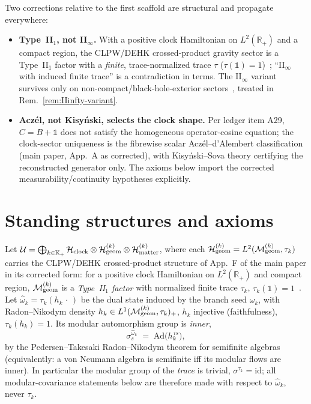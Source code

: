 \documentclass[11pt,a4paper]{article}
\theoremstyle{definition}
\theoremstyle{remark}
\newcommand{\HH}{\mathcal{H}}
\newcommand{\MM}{\mathcal{M}}
\newcommand{\RR}{\mathbb{R}}
\newcommand{\id}{\mathbb{1}}
\newcommand{\KK}{\mathbb{K}}
\newcommand{\tr}{\tau}
\begin{document}
Two corrections relative to the first scaffold are structural
and propagate everywhere:
\begin{itemize}[leftmargin=*,nosep]
  \item \textbf{Type~II$_1$, not II$_\infty$.} With a positive
    clock Hamiltonian on $L^2(\RR_+)$ and a compact region, the
    CLPW/DEHK crossed-product gravity sector is a Type~II$_1$
    factor with a \emph{finite}, trace-normalized trace $\tr$
    ($\tr(\id)=1$)~\cite{CLPW2022}; ``II$_\infty$ with induced
    finite trace'' is a contradiction in terms. The II$_\infty$
    variant survives only on non-compact/black-hole-exterior
    sectors~\cite{CPW2022}, treated in
    Rem.~\ref{rem:IIinfty-variant}.
  \item \textbf{Acz\'el, not Kisy\'nski, selects the clock
    shape.} Per ledger item A29, $C=B+\id$ does not satisfy the
    homogeneous operator-cosine equation; the clock-sector
    uniqueness is the fibrewise scalar Acz\'el--d'Alembert
    classification (main paper, App.~A as corrected), with
    Kisy\'nski--Sova theory certifying the reconstructed
    generator only. The axioms below import the corrected
    measurability/continuity hypotheses explicitly.
\end{itemize}

\section{Standing structures and axioms}
\label{sec:axioms}

Let $\mathcal U=\bigoplus_{k\in\KK_+}\HH_{\rm clock}\otimes
\HH_{\rm geom}^{(k)}\otimes\HH_{\rm matter}^{(k)}$, where each
$\HH_{\rm geom}^{(k)}=L^2(\MM_{\rm geom}^{(k)},\tr_k)$ carries
the CLPW/DEHK crossed-product structure of App.~F of the main
paper in its corrected form: for a positive clock Hamiltonian
on $L^2(\RR_+)$ and compact region, $\MM_{\rm geom}^{(k)}$ is a
\emph{Type~II$_1$ factor} with normalized finite trace $\tr_k$,
$\tr_k(\id)=1$~\cite{CLPW2022,PedersenTakesaki1973}. Let
$\hat\omega_k=\tr_k(h_k\,\cdot\,)$ be the dual state induced by
the branch seed $\omega_k$, with Radon--Nikodym density
$h_k\in L^1(\MM_{\rm geom}^{(k)},\tr_k)_+$, $h_k$ injective
(faithfulness), $\tr_k(h_k)=1$. Its modular automorphism group
is \emph{inner},
\begin{equation}\label{eq:inner-modular}
  \sigma^{\hat\omega_k}_s\;=\;\mathrm{Ad}\bigl(h_k^{\,is}\bigr),
\end{equation}
by the Pedersen--Takesaki Radon--Nikodym theorem for semifinite
algebras~\cite{PedersenTakesaki1973} (equivalently: a von
Neumann algebra is semifinite iff its modular flows are inner).
In particular the modular group of the \emph{trace} is trivial,
$\sigma^{\tr_k}=\mathrm{id}$; all modular-covariance statements
below are therefore made with respect to $\hat\omega_k$, never
$\tr_k$.
\end{document}
